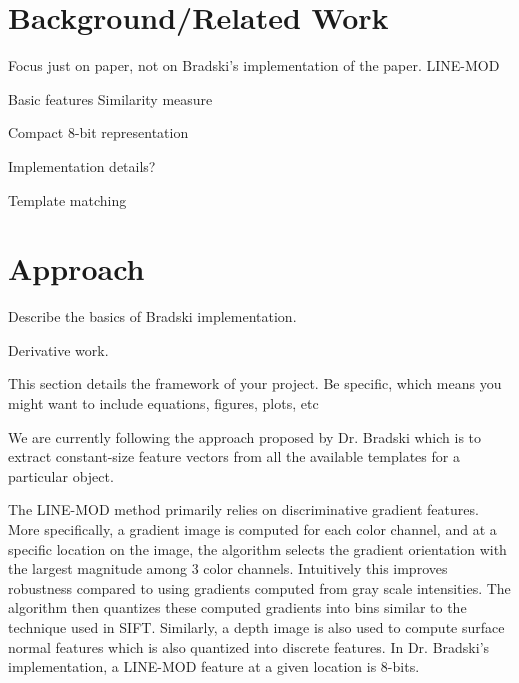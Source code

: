 \documentclass[10pt,twocolumn,letterpaper]{article}
\begin{document}
\section{Background/Related Work}

Focus just on paper, not on Bradski's implementation of the paper.
LINE-MOD

Basic features
Similarity measure

Compact 8-bit representation

Implementation details?

Template matching 

\section{Approach}

Describe the basics of Bradski implementation.

Derivative work.

This section details the framework of your project. Be specific, which means you might want to include equations, figures, plots, etc

We are currently following the approach proposed by Dr. Bradski which is to extract constant-size feature vectors from all the available templates for a particular object.

The LINE-MOD method primarily relies on discriminative gradient features. More specifically, a gradient image is computed for each color channel, and at a specific location on the image, the algorithm selects the gradient orientation with the largest magnitude among 3 color channels. Intuitively this improves robustness compared to using gradients computed from gray scale intensities. The algorithm then quantizes these computed gradients into bins similar to the technique used in SIFT. Similarly, a depth image is also used to compute surface normal features which is also quantized into discrete features. In Dr. Bradski’s implementation, a LINE-MOD feature at a given location is 8-bits.
\end{document}
